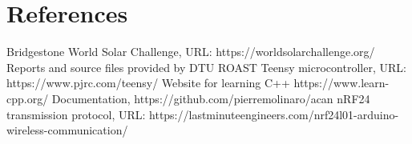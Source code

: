 \documentclass[conference]{IEEEtran}
\begin{document}
\section{References}
\begingroup
\renewcommand{\section}[2]{}%
\begin{thebibliography}{}
Bridgestone World Solar Challenge, 
URL: https://worldsolarchallenge.org/
Reports and source files provided by DTU ROAST
Teensy microcontroller,
URL: https://www.pjrc.com/teensy/
Website for learning C++
https://www.learn-cpp.org/
Documentation,
https://github.com/pierremolinaro/acan
nRF24 transmission protocol, URL: https://lastminuteengineers.com/nrf24l01-arduino-wireless-communication/
\end{thebibliography}
\endgroup
\end{document}
